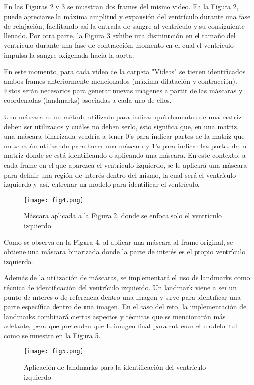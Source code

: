 \documentclass[runningheads]{llncs}
\begin{document}
En las Figuras 2 y 3 se muestran dos frames del mismo video. En la Figura 2, puede apreciarse la máxima amplitud y expansión del ventrículo durante una fase de relajación, facilitando así la entrada de sangre al ventrículo y su consiguiente llenado.  Por otra parte, la Figura 3 exhibe una disminución en el tamaño del ventrículo durante una fase de contracción, momento en el cual el ventrículo impulsa la sangre oxigenada hacia la aorta.

En este momento, para cada video de la carpeta "Videos" se tienen identificados ambos frames anteriormente mencionados (máxima dilatación y contracción). Estos serán necesarios para generar nuevas imágenes a partir de las máscaras y coordenadas (landmarks) asociadas a cada uno de ellos.

Una máscara es un método utilizado para indicar qué elementos de una matriz deben ser utilizados y cuáles no deben serlo, esto significa que, en una matriz, una máscara binarizada vendría a tener 0's para indicar partes de la matriz que no se están utilizando para hacer una máscara y 1's para indicar las partes de la matriz donde se está identificando o aplicando una máscara. \citep{tutorialspoint} \citep{mlscience} En este contexto, a cada frame en el que aparezca el ventrículo izquierdo, se le aplicará una máscara para definir una región de interés dentro del mismo, la cual será el ventrículo izquierdo y así, entrenar un modelo para identificar el ventrículo.
\begin{figure} [H]
    \centering
    \texttt{[image: fig4.png]}
    \caption{Máscara aplicada a la Figura 2, donde se enfoca solo el ventrículo izquierdo}
    \label{fig:fig4}
\end{figure}

Como se observa en la Figura 4, al aplicar una máscara al frame original, se obtiene una máscara binarizada donde la parte de interés es el propio ventrículo izquierdo.

Además de la utilización de máscaras, se implementará el uso de landmarks como técnica de identificación del ventrículo izquierdo. Un landmark viene a ser un punto de interés o de referencia dentro una imagen y sirve para identificar una parte específica dentro de una imagen. \citep{datalya} En el caso del reto, la implementación de landmarks combinará ciertos aspectos y técnicas que se mencionarán más adelante, pero que pretenden que la imagen final para entrenar el modelo, tal como se muestra en la Figura 5.

\begin{figure} [H]
    \centering
    \texttt{[image: fig5.png]}
    \caption{Aplicación de landmarks para la identificación 
 del ventrículo izquierdo }
    \label{fig:fig5}
\end{figure}
\end{document}
